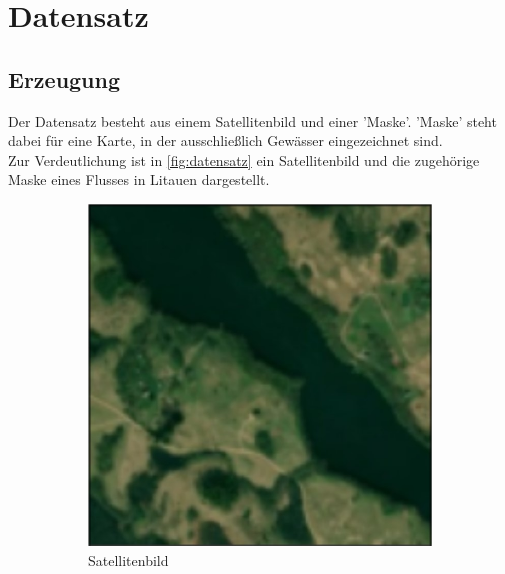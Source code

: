 \section{Datensatz}
\label{sec:datensatz}
\subsection{Erzeugung}
Der Datensatz besteht aus einem Satellitenbild und einer 'Maske'.
'Maske' steht dabei für eine Karte, in der ausschließlich Gewässer eingezeichnet sind.
\\
Zur Verdeutlichung ist in \autoref{fig:datensatz} ein Satellitenbild und die zugehörige Maske eines Flusses in Litauen dargestellt.
\begin{figure}
    \centering
    \begin{subfigure}{0.2\textwidth}
        \centering
        \includegraphics[width=\textwidth]{content/img/datensatz_satellite.jpg}
        \caption{Satellitenbild}
    \end{subfigure}
    \begin{subfigure}{0.2\textwidth}
        \centering

\end{subfigure}
\end{figure}
